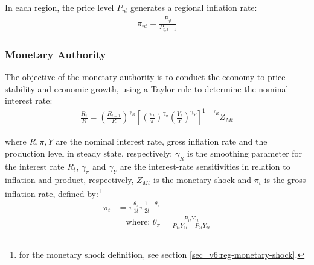 \documentclass[../thesis.tex]{subfiles}
\begin{document}
In each region, the price level $P_{\eta t}$ generates a regional inflation rate:
\begin{align}
	\pi_{\eta t} = \frac{P_{\eta t}}{P_{\eta, t-1}} \label{eq_v2:reg-regional-inflation}
\end{align}


\subsubsection{Monetary Authority}

The objective of the monetary authority is to conduct the economy to price stability and economic growth, using a Taylor rule \cite{taylor_discretion_1993} to determine the nominal interest rate:
\begin{align}
	\label{eq_v2:reg-monetary-policy}
	\frac{R_{t}}{R} =
	\left( \frac{R_{t-1}}{R} \right)^{\gamma_{R}}  \left[
	\left( \frac{\pi_t}{\pi} \right)^{\gamma_{\pi}}
	\left( \frac{Y_{t}}{Y} \right)^{\gamma_{Y}} \right]^{1-\gamma_{R}} Z_{Mt}
\end{align}

where $R, \pi, Y$ are the nominal interest rate, gross inflation rate and the production level in steady state, respectively; $\gamma_{R}$ is the smoothing parameter for the interest rate $R_{t}$, $\gamma_{\pi}$ and $\gamma_{Y}$ are the interest-rate sensitivities in relation to inflation and product, respectively, $Z_{Mt}$ is the monetary shock and $\pi_t$ is the gross inflation rate, defined by:\footnote{for the monetary shock definition, see section \ref{sec_v6:reg-monetary-shock}.}
\begin{align}
	\pi_{t} &= \pi_{1t}^{\theta_{\pi}} \pi_{2t}^{1 - \theta_{\pi}} \label{eq_v2:reg-gross-inflation-rate} \\ 
	&\quad \text{where: } \theta_{\pi} = \frac{P_{1t} Y_{1t}}{P_{1t} Y_{1t} + P_{2t} Y_{2t}} \label{eq_v2:reg-theta-pi}
\end{align}
\end{document}
